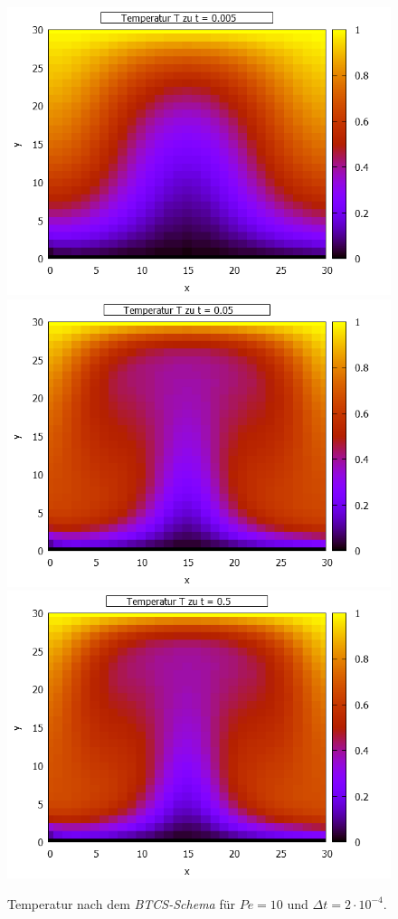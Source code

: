 \documentclass[12pt,a4paper,titlepage,headinclude,bibtotoc]{scrartcl}
\begin{document}
\noindent\begin{minipage}[t]{0.55\textwidth}%
\begin{figure}[H]  
   \includegraphics[width=\linewidth]{res/task6/grid0005.png}
   \includegraphics[width=\linewidth]{res/task6/grid005.png}
   \includegraphics[width=\linewidth]{res/task6/grid05.png}
   \caption{Temperatur nach dem \textit{BTCS-Schema} für $Pe=10$ und $\Delta t = 2\cdot10^{-4}$.}
   \label{fig:task6}
   \end{figure}
\end{minipage}%
\end{document}

